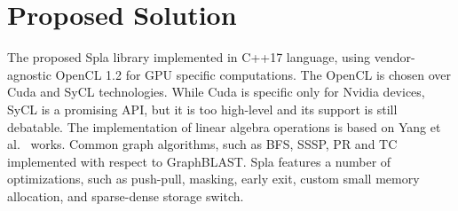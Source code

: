 \section{Proposed Solution}

The proposed Spla library implemented in C++17 language, using vendor-agnostic OpenCL 1.2 for GPU specific computations. The OpenCL is chosen over Cuda and SyCL technologies. While Cuda is specific only for Nvidia devices, SyCL is a promising API, but it is too high-level and its support is still debatable. The implementation of linear algebra operations is based on Yang et al.~\cite{7284398:spvspm, https://doi.org/10.48550/arxiv.1804.03327:pushpull, yang2019graphblast} works. Common graph algorithms, such as BFS, SSSP, PR and TC implemented with respect to GraphBLAST. Spla features a number of optimizations, such as push-pull, masking, early exit, custom small memory allocation, and sparse-dense storage switch.